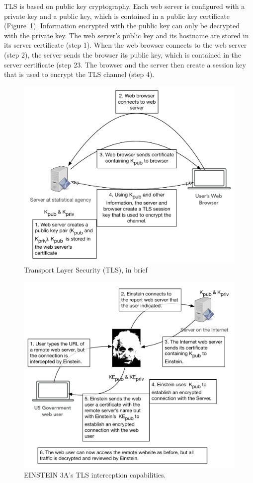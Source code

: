 \documentclass[fleqn,10pt]{wlscirep}
\begin{document}
TLS is based on public key cryptography. Each web server is configured
with a private key and a public key, which is contained in a public
key certificate (Figure~\ref{tls}). Information encrypted with the public key can only
be decrypted with the private key. The web server's public key and its
hostname are stored in its server certificate (step 1). When the web browser connects to the
web server (step 2), the server sends the browser its public key, which is
contained in the server certificate (step 23. The browser and the
server then create a session key that is used to encrypt the TLS
channel (step 4). 

\begin{figure}
  \includegraphics{art/tls.pdf}
  \caption{Transport Layer Security (TLS), in brief}\label{tls}
  \end{figure}

\begin{figure}
  \includegraphics{art/emonitoring.pdf}
  \caption{EINSTEIN 3A's TLS interception capabilities.}\label{emonitoring}
  \end{figure}
\end{document}
